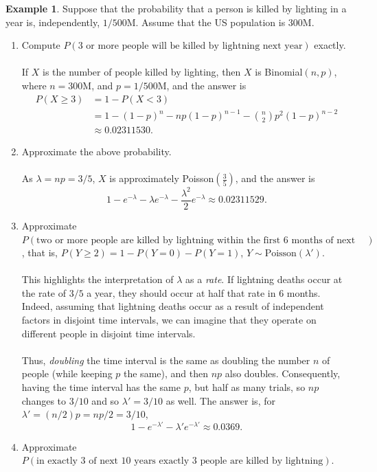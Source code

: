 \documentclass[12pt,a4paper]{article}
\theoremstyle{definition}
\newtheorem{example}{Example}[section]
\theoremstyle{definition}
\theoremstyle{definition}
\theoremstyle{definition}
\theoremstyle{remark}
\theoremstyle{definition}
\newcommand{\dispsty}{\displaystyle}
\begin{document}
\begin{example}
	Suppose that the probability that a person is killed by lighting in a year is, independently, $1/500\text{M}$. Assume that the US population is $300$M.\begin{enumerate}
		\item Compute $P(\text{3 or more people will be killed by lightning next year})$ exactly.\\
		\\
		If $X$ is the number of people killed by lighting, then $X$ is Binomial$(n,p)$, where $n=300$M, and $p=1/500\text{M}$, and the answer is \begin{align*}
		P(X\geq 3)&=1-P(X<3)\\
		&=1-(1-p)^n-np(1-p)^{n-1}-\binom{n}{2}p^2(1-p)^{n-2}\\
		&\approx 0.02311530.
		\end{align*}
		\item  Approximate the above probability.\\
		\\
		As $\lambda=np=3/5$, $X$ is approximately Poisson$\dispsty\left(\frac{3}{5}\right)$, and the answer is \[
		1-e^{-\lambda}-\lambda e^{-\lambda}-\frac{\lambda^2}{2}e^{-\lambda}\approx0.02311529.
		\]\newpage
		\item Approximate $P(\text{two or more people are killed by lightning within the first 6 months of next year})$, that is, $P(Y\geq 2)=1-P(Y=0)-P(Y=1)$, $Y\sim\text{Poisson}(\lambda')$.\\
		\\
		This highlights the interpretation of $\lambda$ as a \textit{rate}. If lightning deaths occur at the rate of $3/5$ a year, they should occur at half that rate in 6 months. Indeed, assuming that lightning deaths occur as a result of independent factors in disjoint time intervals, we can imagine that they operate on different people in disjoint time intervals.\\
		\\
		Thus, \textit{doubling} the time interval is the same as doubling the number $n$ of people (while keeping $p$ the same), and then $np$ also doubles. Consequently, having the time interval has the same $p$, but half as many trials, so $np$ changes to $3/10$ and so $\lambda'=3/10$ as well. The answer is, for $\lambda'=(n/2)p=np/2=3/10$, \[
		1-e^{-\lambda'}-\lambda'e^{-\lambda'}\approx0.0369.
		\]
		\item Approximate $P(\text{in exactly 3 of next 10 years exactly 3 people are killed by lightning})$.\\

\end{enumerate}
\end{example}
\end{document}
